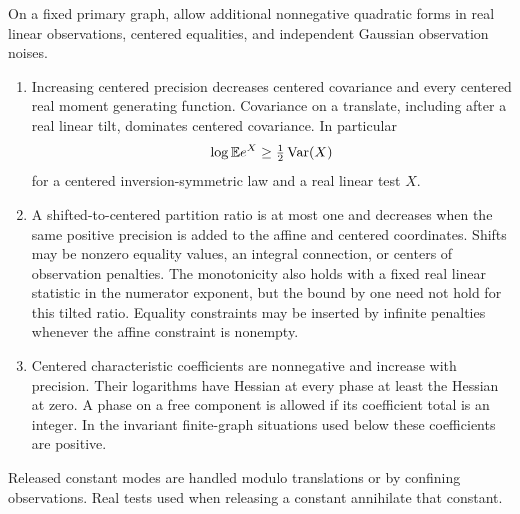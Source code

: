 \begin{lemma}\label{lem:comparisons}
On a fixed primary graph, allow additional nonnegative quadratic
forms in real linear observations, centered equalities, and
independent Gaussian observation noises.
\begin{enumerate}[label=\textup{(\roman*)},leftmargin=*]
 \item Increasing centered precision decreases centered covariance
 and every centered real moment generating function. Covariance on
 a translate, including after a real linear tilt, dominates centered
 covariance. In particular
 \[
  \log\mathbb E e^X\ge \tfrac12\operatorname{Var}(X)
 \]
 for a centered inversion-symmetric law and a real linear test \(X\).
 \item A shifted-to-centered partition ratio is at most one and
 decreases when the same positive precision is added to the affine
 and centered coordinates. Shifts may be nonzero equality values,
 an integral connection, or centers of observation penalties.
 The monotonicity also holds with a fixed real linear statistic in
 the numerator exponent, but the bound by one need not hold for
 this tilted ratio. Equality constraints may be inserted by
 infinite penalties whenever the affine constraint is nonempty.
 \item Centered characteristic coefficients are nonnegative and
 increase with precision. Their logarithms have Hessian at every
 phase at least the Hessian at zero. A phase on a free component is
 allowed if its coefficient total is an integer. In the invariant
 finite-graph situations used below these coefficients are positive.
\end{enumerate}
Released constant modes are handled modulo translations or by
confining observations. Real tests used when releasing a constant
annihilate that constant.
\end{lemma}


